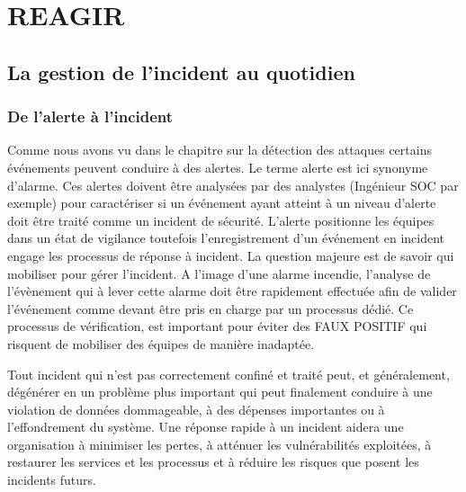 %
%

\section{REAGIR}


\subsection{La gestion de l'incident au quotidien} 





\subsubsection{De l'alerte à l'incident}



Comme nous avons vu dans le chapitre sur la détection des attaques certains événements peuvent conduire à des alertes. Le terme alerte est ici synonyme d'alarme.  Ces alertes  doivent être analysées par des  analystes (Ingénieur SOC par exemple) pour caractériser si un événement ayant atteint à un niveau d'alerte doit être traité comme un incident de sécurité. L'alerte positionne les équipes dans un état de vigilance toutefois l'enregistrement d'un événement en incident engage les processus de réponse à  incident.
La question majeure est de savoir qui  mobiliser pour gérer l'incident. A l'image d'une alarme incendie, l'analyse de l'évènement qui à lever cette alarme doit être rapidement effectuée afin de valider l'événement comme devant être pris en charge par un processus dédié. 
Ce processus de vérification, est important pour éviter des FAUX POSITIF qui risquent de mobiliser des équipes de manière inadaptée.

Tout incident qui n'est pas correctement confiné et traité peut, et généralement, dégénérer en un problème plus important qui peut finalement conduire à une violation de données dommageable, à des dépenses importantes ou à l'effondrement du système. Une réponse rapide à un incident aidera une organisation à minimiser les pertes, à atténuer les vulnérabilités exploitées, à restaurer les services et les processus et à réduire les risques que posent les incidents futurs.
 
